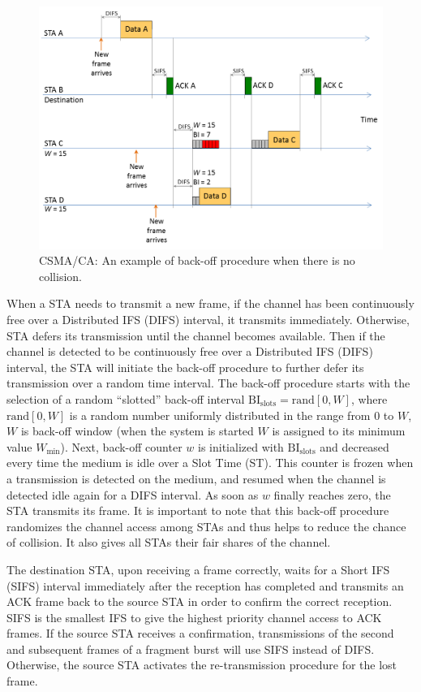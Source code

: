 \begin{figure}[!t]
	\centering
	\includegraphics[width=0.9\columnwidth]{figs/CSMA-CA-back-off-no-collision}
	\caption{CSMA/CA: An example of back-off procedure when there is no collision.}
	\label{figs:CSMA-CA-back-off-no-collision}
\end{figure}

When a STA needs to transmit a new frame, if the channel has been continuously free over a Distributed IFS (DIFS) interval, it transmits immediately. Otherwise, STA defers its transmission until the channel becomes available. Then if the channel is detected to be continuously free over a Distributed IFS (DIFS) interval, the STA will initiate the back-off procedure to further defer its transmission over a random time interval. The back-off procedure starts with the selection of a random ``slotted'' back-off interval $\mathrm{BI_{slots}} = \mathrm{rand}[0,W]$, where $\mathrm{rand}[0,W]$ is a random number uniformly distributed in the range from $0$ to $W$, $W$ is back-off window (when the system is started $W$ is assigned to its minimum value $W_{\min}$). Next, back-off counter $w$ is initialized with $\mathrm{BI_{slots}}$ and decreased every time the medium is idle over a Slot Time (ST). This counter is frozen when a transmission is detected on the medium, and resumed when the channel is detected idle again for a DIFS interval. As soon as $w$ finally reaches zero, the STA transmits its frame. It is important to note that this back-off procedure randomizes the channel access among STAs and thus helps to reduce the chance of collision. It also gives all STAs their fair shares of the channel.

The destination STA, upon receiving a frame correctly, waits for a Short IFS (SIFS) interval immediately after the reception has completed and transmits an ACK frame back to the source STA in order to confirm the correct reception. SIFS is the smallest IFS to give the highest priority channel access to ACK frames. If the source STA receives a confirmation, transmissions of the second and subsequent frames of a fragment burst will use SIFS instead of DIFS. Otherwise, the source STA activates the re-transmission procedure for the lost frame.


